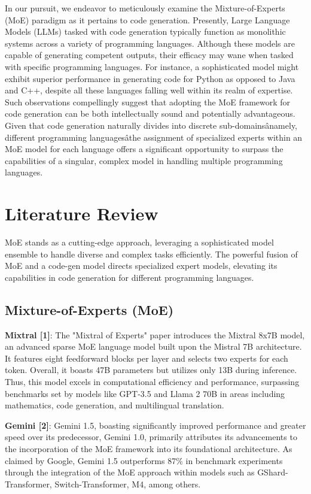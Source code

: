 \documentclass{article}
\begin{document}
	In our pursuit, we endeavor to meticulously examine the Mixture-of-Experts (MoE)
	paradigm as it pertains to code generation. Presently, Large Language Models (LLMs)
	tasked with code generation typically function as monolithic systems across a variety
	of programming languages. Although these models are capable of generating
	competent outputs, their efficacy may wane when tasked with specific programming
	languages. For instance, a sophisticated model might exhibit superior performance
	in generating code for Python as opposed to Java and C++, despite all these
	languages falling well within its realm of expertise. Such observations compellingly
	suggest that adopting the MoE framework for code generation can be both intellectually
	sound and potentially advantageous. Given that code generation naturally
	divides into discrete sub-domainsânamely, different programming languagesâthe assignment
	of specialized experts within an MoE model for each language offers a significant
	opportunity to surpass the capabilities of a singular, complex model in
	handling multiple programming languages.

	\section{Literature Review}

	MoE stands as a cutting-edge approach, leveraging a sophisticated model
	ensemble to handle diverse and complex tasks efficiently. The powerful fusion of
	MoE and a code-gen model directs specialized expert models, elevating its
	capabilities in code generation for different programming languages.

	\subsection{Mixture-of-Experts (MoE)}

	\textbf{Mixtral [1]}: The "Mixtral of Experts" paper introduces the Mixtral 8x7B
	model, an advanced sparse MoE language model built upon the Mistral 7B
	architecture. It features eight feedforward blocks per layer and selects two experts
	for each token. Overall, it boasts 47B parameters but utilizes only 13B during
	inference. Thus, this model excels in computational efficiency and performance,
	surpassing benchmarks set by models like GPT-3.5 and Llama 2 70B in areas
	including mathematics, code generation, and multilingual translation.

	\textbf{Gemini [2]}: Gemini 1.5, boasting significantly improved performance and
	greater speed over its predecessor, Gemini 1.0, primarily attributes its advancements
	to the incorporation of the MoE framework into its foundational architecture.
	As claimed by Google, Gemini 1.5 outperforms 87\% in benchmark experiments
	through the integration of the MoE approach within models such as GShard-Transformer,
	Switch-Transformer, M4, among others.
\end{document}
